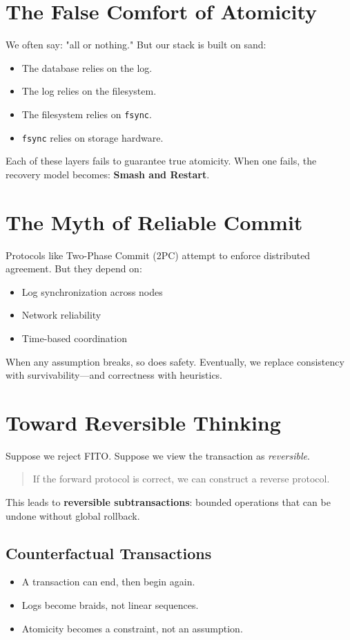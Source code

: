 \section{The False Comfort of Atomicity}
We often say: "all or nothing." But our stack is built on sand:
\begin{itemize}
  \item The database relies on the log.
  \item The log relies on the filesystem.
  \item The filesystem relies on \texttt{fsync}.
  \item \texttt{fsync} relies on storage hardware.
\end{itemize}
Each of these layers fails to guarantee true atomicity. When one fails, the recovery model becomes:\textbf{ Smash and Restart}.

\section{The Myth of Reliable Commit}
Protocols like Two-Phase Commit (2PC) attempt to enforce distributed agreement. But they depend on:
\begin{itemize}
  \item Log synchronization across nodes
  \item Network reliability
  \item Time-based coordination
\end{itemize}

When any assumption breaks, so does safety. Eventually, we replace consistency with survivability—and correctness with heuristics.

\section{Toward Reversible Thinking}
Suppose we reject FITO. Suppose we view the transaction as \emph{reversible}. 

\begin{quote}
If the forward protocol is correct, we can construct a reverse protocol.
\end{quote}

This leads to \textbf{reversible subtransactions}: bounded operations that can be undone without global rollback.

\subsection*{Counterfactual Transactions}
\begin{itemize}
  \item A transaction can end, then begin again.
  \item Logs become braids, not linear sequences.
  \item Atomicity becomes a constraint, not an assumption.
\end{itemize}

